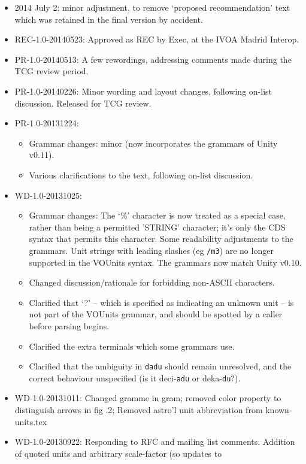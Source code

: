 \documentclass[11pt,a4paper]{ivoa}
\newcommand{\unit}[1]{\texttt{\small\color{orange}#1}}
\begin{document}
\begin{itemize}
\item 2014 July 2: minor adjustment, to remove `proposed
recommendation' text which was retained in the final version by accident.
\item REC-1.0-20140523: Approved as REC by Exec, at the IVOA Madrid Interop.
\item PR-1.0-20140513:
A few rewordings, addressing comments made during the TCG review period.
\item PR-1.0-20140226:
Minor wording and layout changes, following on-list discussion.
Released for TCG review.
\item PR-1.0-20131224:
\begin{itemize}
\item Grammar changes: minor (now incorporates the grammars of Unity v0.11).
\item Various clarifications to the text, following on-list discussion.
\end{itemize}
\item WD-1.0-20131025:
\begin{itemize}
\item Grammar changes: The `\%' character is now treated as a special
    case, rather than being a permitted 'STRING' character; it's only
    the CDS syntax that permits this character.  Some readability
    adjustments to the grammars.  Unit strings with leading slashes
    (eg \unit{/m3}) are no longer supported in the VOUnits syntax.
    The grammars now match Unity v0.10.
\item Changed discussion/rationale for forbidding non-ASCII
    characters.
\item Clarified that `?' -- which is specified as indicating an
    unknown unit -- is not part of the VOUnits grammar, and should be
    spotted by a caller before parsing begins.
\item Clarified the extra terminals which some grammars use.
\item Clarified that the ambiguity in \unit{dadu} should remain
    unresolved, and the correct behaviour unspecified (is it
    deci-\texttt{adu} or deka-\texttt{du}?).
\end{itemize}
\item WD-1.0-20131011: Changed gramme in gram; removed color property to distinguish arrows in fig .2;
Removed astro'l unit abbreviation from known-units.tex
\item WD-1.0-20130922: Responding to RFC and mailing list comments.
Addition of quoted units and arbitrary scale-factor (so updates to

\end{itemize}
\end{document}
